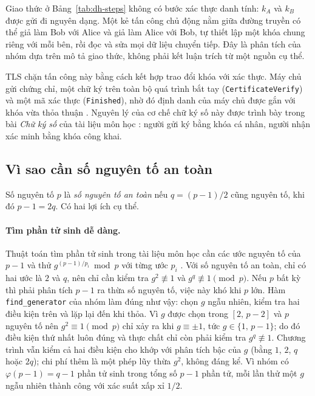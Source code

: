 Giao thức ở Bảng~\ref{tab:dh-steps} không có bước xác thực danh tính: $k_A$ và
$k_B$ được gửi đi nguyên dạng. Một kẻ tấn công chủ động nằm giữa đường truyền có
thể giả làm Bob với Alice và giả làm Alice với Bob, tự thiết lập một khóa chung
riêng với mỗi bên, rồi đọc và sửa mọi dữ liệu chuyển tiếp. Đây là phân tích của
nhóm dựa trên mô tả giao thức, không phải kết luận trích từ một nguồn cụ thể.

TLS chặn tấn công này bằng cách kết hợp trao đổi khóa với xác thực. Máy chủ gửi
chứng chỉ, một chữ ký trên toàn bộ quá trình bắt tay (\texttt{CertificateVerify})
và một mã xác thực (\texttt{Finished}), nhờ đó định danh của máy chủ được gắn với
khóa vừa thỏa thuận \cite{rfc9846}. Nguyên lý của cơ chế chữ ký số này được trình bày
trong bài \emph{Chữ ký số} của tài liệu môn học \cite{slide-bai4}: người gửi ký bằng
khóa cá nhân, người nhận xác minh bằng khóa công khai.

\subsection{Vì sao cần số nguyên tố an toàn}

Số nguyên tố $p$ là \emph{số nguyên tố an toàn} nếu $q = (p-1)/2$ cũng nguyên tố,
khi đó $p-1 = 2q$. Có hai lợi ích cụ thể.

\paragraph{Tìm phần tử sinh dễ dàng.}
Thuật toán tìm phần tử sinh trong tài liệu môn học cần các ước nguyên tố của
$p-1$ và thử $g^{(p-1)/p_i} \bmod p$ với từng ước $p_i$ \cite{slide-bai2}. Với số
nguyên tố an toàn, chỉ có hai ước là $2$ và $q$, nên chỉ cần kiểm tra
$g^2 \not\equiv 1$ và $g^q \not\equiv 1 \pmod p$. Nếu $p$ bất kỳ thì phải phân
tích $p-1$ ra thừa số nguyên tố, việc này khó khi $p$ lớn. Hàm
\texttt{find\_\allowbreak generator} của nhóm làm đúng như vậy: chọn $g$ ngẫu nhiên,
kiểm tra hai điều kiện trên và lặp lại đến khi thỏa. Vì $g$ được chọn trong $[2,\,p-2]$ và $p$ nguyên tố nên $g^2 \equiv 1 \pmod p$ chỉ xảy ra khi $g \equiv \pm 1$, tức $g \in \{1,\,p-1\}$; do đó điều kiện thứ nhất luôn đúng và thực chất chỉ còn phải kiểm tra $g^q \not\equiv 1$. Chương trình vẫn kiểm cả hai điều kiện cho khớp với phân tích bậc của $g$ (bằng $1$, $2$, $q$ hoặc $2q$); chi phí thêm là một phép lũy thừa $g^2$, không đáng kể.
Vì nhóm có $\varphi(p-1)=q-1$
phần tử sinh trong tổng số $p-1$ phần tử, mỗi lần thử một $g$ ngẫu nhiên thành
công với xác suất xấp xỉ $1/2$.

